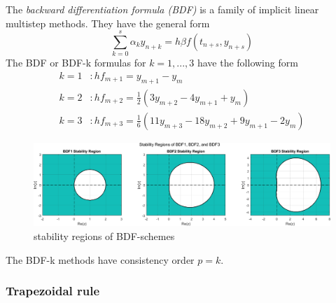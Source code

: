 	\begin{frame}
		The \emph{backward differentiation formula (BDF)} is a family of implicit linear multistep methods. They have the general form
		\begin{equation}
			\sum_{k=0}^{s} \alpha_k y_{n+k} = h \beta f(t_{n+s}, y_{n+s})
		\end{equation}
		The BDF or BDF-k formulas for $k=1,...,3$ have the following form %
		\begin{align*}
			k = 1 &: h f_{m+1} = y_{m+1} - y_m \\
			k = 2 &: h f_{m+2} = \frac{1}{2} (3 y_{m+2} - 4 y_{m+1} + y_m) \\
			k = 3 &: h f_{m+3} = \frac{1}{6} (11 y_{m+3} - 18 y_{m+2} + 9 y_{m+1} - 2 y_m) %
		\end{align*}
	\end{frame}
	
	\begin{frame}
		\begin{figure}[H]
			\centering
			\includegraphics[width=1\linewidth]{../Tex/pictures/bdf_stability_regions.png}
			\caption{stability regions of BDF-schemes}
			\label{fig:screenshot020}
		\end{figure}
		\begin{theorem}
			The BDF-k methods have consistency order $p=k$.
		\end{theorem}
	\end{frame}
	
	\subsubsection{Trapezoidal rule}
	
